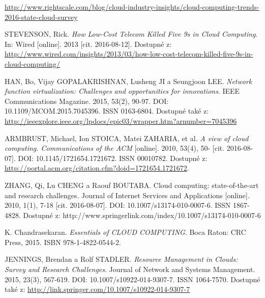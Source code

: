 
 \renewcommand{\appendixname}{Literatura}%

  
\begin{thebibliography}{10}

\url{http://www.rightscale.com/blog/cloud-industry-insights/cloud-computing-trends-2016-state-cloud-survey}

STEVENSON, Rick. \emph{How Low-Cost Telecom Killed Five 9s in Cloud Computing}. In: Wired [online]. 2013 [cit. 2016-08-12]. Dostupné z: \url{http://www.wired.com/insights/2013/03/how-low-cost-telecom-killed-five-9s-in-cloud-computing/}

HAN, Bo, Vijay GOPALAKRISHNAN, Lusheng JI a Seungjoon LEE. \emph{Network function virtualization: Challenges and opportunities for innovations}. IEEE Communications Magazine. 2015, 53(2), 90-97. DOI: 10.1109/MCOM.2015.7045396. ISSN 0163-6804. Dostupné také z: \url{http://ieeexplore.ieee.org/lpdocs/epic03/wrapper.htm?arnumber=7045396}




ARMBRUST, Michael, Ion STOICA, Matei ZAHARIA, et al. \emph{A view of cloud computing. Communications of the ACM} [online]. 2010, 53(4), 50- [cit. 2016-08-07]. DOI: 10.1145/1721654.1721672. ISSN 00010782. Dostupné z: \url{http://portal.acm.org/citation.cfm?doid=1721654.1721672}.

ZHANG, Qi, Lu CHENG a Raouf BOUTABA. Cloud computing: state-of-the-art and research challenges. Journal of Internet Services and Applications [online]. 2010, 1(1), 7-18 [cit. 2016-08-07]. DOI: 10.1007/s13174-010-0007-6. ISSN 1867-4828. Dostupné z: http://www.springerlink.com/index/10.1007/s13174-010-0007-6

K. Chandrasekaran. \emph{Essentials of CLOUD COMPUTING}. Boca Raton: CRC Press, 2015. ISBN 978-1-4822-0544-2.

JENNINGS, Brendan a Rolf STADLER. \emph{Resource Management in Clouds: Survey and Research Challenges}. Journal of Network and Systems Management. 2015, 23(3), 567-619. DOI: 10.1007/s10922-014-9307-7. ISSN 1064-7570. Dostupné také z: \url{http://link.springer.com/10.1007/s10922-014-9307-7}



\end{thebibliography}
